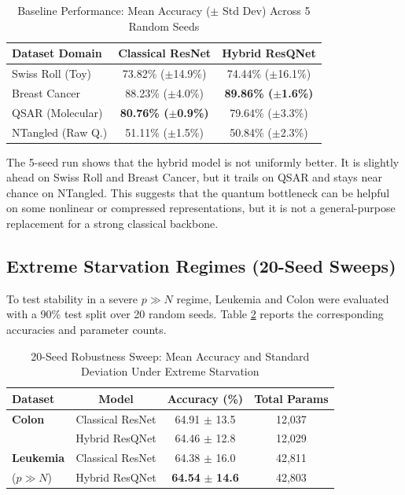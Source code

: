 \documentclass[conference]{IEEEtran}
\begin{document}
\begin{table}[htbp]
\centering
\caption{Baseline Performance: Mean Accuracy ($\pm$ Std Dev) Across 5 Random Seeds}
\label{tab:baseline_results}
\begin{tabular}{@{}lcc@{}}
\toprule
\textbf{Dataset Domain} & \textbf{Classical ResNet} & \textbf{Hybrid ResQNet} \\
\midrule
Swiss Roll (Toy) & 73.82\% ($\pm$14.9\%) & 74.44\% ($\pm$16.1\%) \\
Breast Cancer & 88.23\% ($\pm$4.0\%) & \textbf{89.86\% ($\pm$1.6\%)} \\
QSAR (Molecular) & \textbf{80.76\% ($\pm$0.9\%)} & 79.64\% ($\pm$3.3\%) \\
NTangled (Raw Q.) & 51.11\% ($\pm$1.5\%) & 50.84\% ($\pm$2.3\%) \\
\bottomrule
\end{tabular}
\end{table}

The 5-seed run shows that the hybrid model is not uniformly better. It is slightly ahead on Swiss Roll and Breast Cancer, but it trails on QSAR and stays near chance on NTangled. This suggests that the quantum bottleneck can be helpful on some nonlinear or compressed representations, but it is not a general-purpose replacement for a strong classical backbone.

\subsection{Extreme Starvation Regimes (20-Seed Sweeps)}
To test stability in a severe $p \gg N$ regime, Leukemia and Colon were evaluated with a 90\% test split over 20 random seeds. Table \ref{tab:seed_results} reports the corresponding accuracies and parameter counts.

\begin{table}[htbp]
\centering
\caption{20-Seed Robustness Sweep: Mean Accuracy and Standard Deviation Under Extreme Starvation}
\label{tab:seed_results}
\begin{tabular}{@{}lccc@{}}
\toprule
\textbf{Dataset} & \textbf{Model} & \textbf{Accuracy (\%)} & \textbf{Total Params} \\
\midrule
\textbf{Colon} & Classical ResNet & 64.91 $\pm$ 13.5 & 12,037 \\
 & Hybrid ResQNet & 64.46 $\pm$ 12.8 & 12,029 \\
\midrule
\textbf{Leukemia} & Classical ResNet & 64.38 $\pm$ 16.0 & 42,811 \\
 ($p \gg N$) & Hybrid ResQNet & \textbf{64.54} $\pm$ \textbf{14.6} & 42,803 \\
\bottomrule
\end{tabular}
\end{table}
\end{document}
